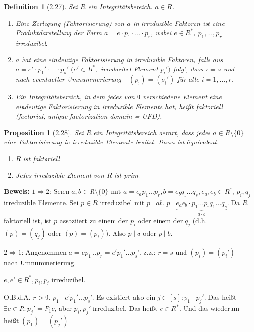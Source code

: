 \documentclass[10pt,a4paper]{article}
\newtheorem{defi}{Definition}
\newtheorem{prop}{Proposition}
\begin{document}
\begin{defi}[2.27]
Sei $R$ ein Integritätsbereich. $a \in R$.\begin{enumerate}
\item Eine \emph{Zerlegung (Faktorisierung) von $a$ in irreduzible Faktoren} ist eine Produktdarstellung der Form $a = e \cdot p_1 \cdot \dots \cdot p_r$, wobei $e \in R^*$, $p_1, \dots, p_r$ irreduzibel.

\item $a$ hat eine \emph{eindeutige} Faktorisierung in irreduzible Faktoren, falls aus $a = e' \cdot p_1' \cdot \dots \cdot p_s'$ $(e' \in R^*,$ irreduzibel Element $p_i')$ folgt, dass $r =s$ und - nach eventueller Umnummerierung - $(p_i) = (p_i')$ für alle $i = 1, \dots, r$.

\item Ein Integritätsbereich, in dem jedes von $0$ verschiedene Element eine \emph{eindeutige} Faktorisierung in irreduzible Elemente hat, heißt \emph{faktoriell} (factorial, unique factorization domain = UFD).
\end{enumerate}
\end{defi}

\begin{prop}[2.28] Sei $R$ ein Integritätsbereich derart, dass jedes $a \in R \setminus \{0\}$ eine Faktorisierung in irreduzible Elemente besitzt. Dann ist äquivalent:

\begin{enumerate}
\item $R$ ist faktoriell 
\item Jedes irreduzible Element von $R$ ist prim.
\end{enumerate}
\end{prop}

\textbf{Beweis:} \glqq $1 \Rightarrow 2$\grqq : Seien $a,b \in R \setminus \{0\}$ mit $a = e_a p_1 \dots p_r, b = e_b q_1 \dots q_s, e_a, e_b \in R^*$, $p_i, q_j$ irreduzible Elemente. Sei $p \in R$ irreduzibel mit $p \mid ab$. $p \mid \underbrace{e_a e_b \cdot p_1 \dots p_r q_1 \dots q_s}_{a \cdot b}$. Da $R$ faktoriell ist, ist $p$ assoziiert zu einem der $p_i$ oder einem der $q_j$ (d.h. $(p) = (q_j)$ oder $(p) = (p_i)$). Also $p \mid a$ oder $p \mid b$.

\glqq $2 \Rightarrow 1$\grqq : Angenommen $a = e p_1 \dots p_r = e' p_1' \dots p_s'$. z.z.: $r =s$ und $(p_i) = (p_i')$ nach Umnummerierung.

$e, e' \in R^*, p_i, p_j$ irreduzibel.

O.B.d.A. $r > 0$. $p_1 \mid e' p_1' \dots p_s'$. Es existiert also ein $j \in [s]: p_1 \mid p_j'$. Das heißt $\exists c \in R: p_j' = P_1 c$, aber $p_i, p_j'$ irreduzibel. Das heißt $c \in R^*$. Und das wiederum heißt $(p_1) = (p_j')$.
\end{document}

